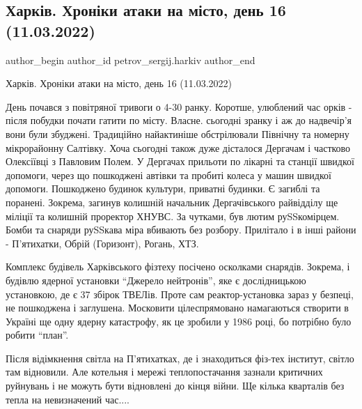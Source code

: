  
 
 
 
 
 
\subsection{Харків. Хроніки атаки на місто, день 16 (11.03.2022)}
\label{sec:11_03_2022.fb.petrov_sergij.harkiv.1.hroniki}
 
\ifcmt
 author_begin
   author_id petrov_sergij.harkiv
 author_end
\fi

Харків. Хроніки атаки на місто, день 16 (11.03.2022)

День почався з повітряної тривоги о 4-30 ранку. Коротше, улюблений час орків -
після побудки почати гатити по місту. Власне. сьогодні зранку і аж до
надвечір'я вони були збуджені. Традиційно найактиніше обстрілювали Північну та
номерну мікрорайонну Салтівку. Хоча сьогодні також дуже дісталося Дергачам і
частково Олексіївці з Павловим Полем. У Дергачах прильоти по лікарні та станції
швидкої допомоги, через що пошкоджені автівки та пробиті колеса у машин швидкої
допомоги. Пошкоджено будинок культури, приватні будинки. Є загиблі та поранені.
Зокрема, загинув колишній начальник Дергачівського райвідділу ще міліції та
колишній проректор ХНУВС. За чутками, був лютим руSSкомірцем. Бомби та снаряди
руSSкава міра вбивають без розбору. Прилітало і в інші райони - П'ятихатки,
Обрій (Горизонт), Рогань, ХТЗ.

Комплекс будівель Харківського фізтеху посічено осколками снарядів. Зокрема, і
будівлю ядерної установки \enquote{Джерело нейтронів}, яке є дослідницькою
установкою, де є 37 збірок ТВЕЛів. Проте сам реактор-установка зараз у безпеці,
не пошкоджена і заглушена. Московити цілеспрямовано намагаються створити в
Україні ще одну ядерну катастрофу, як це зробили у 1986 році, бо потрібно було
робити \enquote{план}.

Після відімкнення світла на П'ятихатках, де і знаходиться фіз-тех інститут,
світло там відновили. Але котельня і мережі теплопостачання зазнали критичних
руйнувань і не можуть бути відновлені до кінця війни. Ще кілька кварталів без
тепла на невизначений час....

